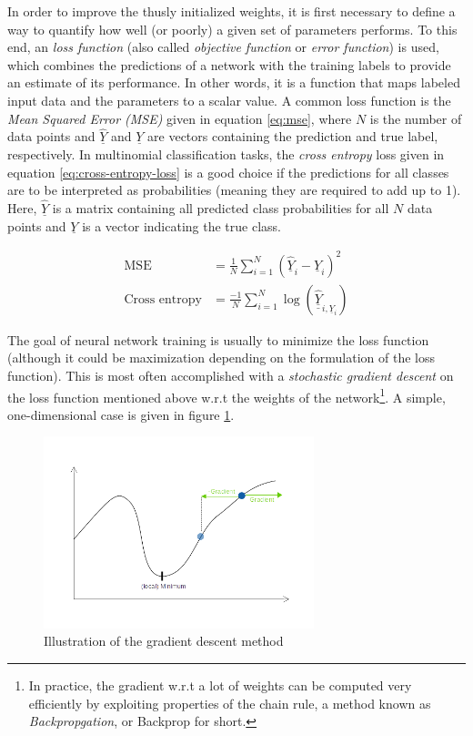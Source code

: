 \documentclass[11pt, a4paper]{article}
\newcommand\braces[1]{\left(#1\right)}
\renewcommand{\vec}[1]{\underline{#1}}
\newcommand{\mat}[1]{\underline{\underline{#1}}}
\begin{document}
In order to improve the thusly initialized weights, it is first necessary to define a way to quantify how well (or poorly) a given set of parameters performs. To this end, an \emph{loss function} (also called \emph{objective function} or \emph{error function}) is used, which combines the predictions of a network with the training labels to provide an estimate of its performance. In other words, it is a function that maps labeled input data and the parameters to a scalar value. A common loss function is the \emph{Mean Squared Error (MSE)} given in equation \eqref{eq:mse}, where $N$ is the number of data points and $\vec{\hat Y}$ and $\vec{Y}$ are vectors containing the prediction and true label, respectively. In multinomial classification tasks, the \emph{cross entropy} loss given in equation \eqref{eq:cross-entropy-loss} \cite{caffe-cross-entropy} is a good choice if the predictions for all classes are to be interpreted as probabilities (meaning they are required to add up to 1). Here, $\vec{\hat Y}$ is a matrix containing all predicted class probabilities for all $N$ data points and $\vec{Y}$ is a vector indicating the true class.

\begin{align}
	\text{MSE} &= \frac{1}{N} \sum_{i=1}^N \braces{\vec{\hat Y}_i - \vec{Y}_i}^2 \label{eq:mse} \\
	\text{Cross entropy} &= \frac{-1}{N} \sum_{i=1}^N \log{\braces{\mat{\hat Y}_{i, \vec{Y}_i}}} \label{eq:cross-entropy-loss}
\end{align}

The goal of neural network training is usually to minimize the loss function (although it could be maximization depending on the formulation of the loss function). This is most often accomplished with a \emph{stochastic gradient descent} on the loss function mentioned above w.r.t the weights of the network\footnote{In practice, the gradient w.r.t a lot of weights can be computed very efficiently by exploiting properties of the chain rule, a method known as \emph{Backpropgation}, or Backprop for short.}. A simple, one-dimensional case is given in figure \ref{fig:gradient-descent}.

\begin{figure}[htp]
	\centering
	\includegraphics[width=0.7\textwidth]{images/gradient_descent.png}
	\caption{Illustration of the gradient descent method}
	\label{fig:gradient-descent}
\end{figure}
\end{document}
